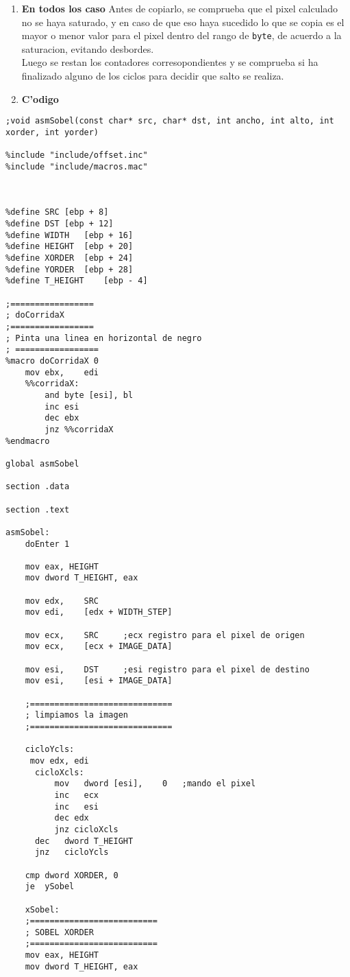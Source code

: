 \documentclass[11pt]{article}
\begin{document}
\begin{enumerate}
\item \textbf{En todos los caso}
\subitem Antes de copiarlo, se comprueba que el pixel calculado no se haya saturado, y en caso de que eso haya sucedido lo que se copia es el mayor o menor valor para el pixel dentro del rango de \verb'byte', de acuerdo a la saturacion, evitando desbordes.\\
Luego se restan los contadores corresopondientes y se comprueba si ha finalizado alguno de los ciclos para decidir que salto se realiza.
\item \textbf{C'odigo}
\end{enumerate}
\begin{lstlisting}[frame=single]
;void asmSobel(const char* src, char* dst, int ancho, int alto, int xorder, int yorder)

%include "include/offset.inc"
%include "include/macros.mac"



%define SRC	[ebp + 8]
%define DST	[ebp + 12]
%define WIDTH 	[ebp + 16]
%define HEIGHT	[ebp + 20]
%define XORDER	[ebp + 24]
%define YORDER	[ebp + 28]
%define T_HEIGHT	[ebp - 4]

;=================
; doCorridaX
;=================
; Pinta una linea en horizontal de negro
; =================
%macro doCorridaX 0
	mov ebx,	edi
	%%corridaX:
		and byte [esi], bl
		inc esi		
		dec ebx
		jnz %%corridaX
%endmacro

global asmSobel

section .data

section .text

asmSobel:
	doEnter 1

	mov eax, HEIGHT
	mov dword T_HEIGHT, eax

	mov	edx,	SRC
	mov	edi,	[edx + WIDTH_STEP]
	
	mov	ecx,	SRC		;ecx registro para el pixel de origen
	mov	ecx,	[ecx + IMAGE_DATA]

	mov	esi,	DST		;esi registro para el pixel de destino
	mov	esi,	[esi + IMAGE_DATA]

	;=============================
	; limpiamos la imagen
	;=============================

	cicloYcls:
	 mov edx, edi
	  cicloXcls:
	      mov	dword [esi],	0	;mando el pixel
	      inc	ecx
	      inc	esi
	      dec edx
	      jnz cicloXcls
	  dec	dword T_HEIGHT
	  jnz	cicloYcls
	
	cmp dword XORDER, 0
	je	ySobel

	xSobel:
	;==========================
	; SOBEL XORDER
	;==========================
	mov eax, HEIGHT
	mov dword T_HEIGHT, eax


\end{lstlisting}
\end{document}
